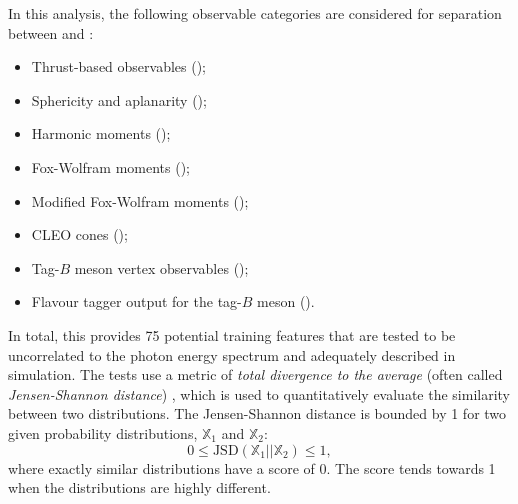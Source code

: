 In this analysis, the following observable categories are considered for separation between \epem\ra\qqbar and \BtoXsgamma:
\begin{itemize}
    \item Thrust-based observables ();
    \item Sphericity and aplanarity ();
    \item Harmonic moments ();
    \item Fox-Wolfram moments ();
    \item Modified Fox-Wolfram moments ();
    \item CLEO cones ();
    \item Tag-$B$ meson vertex observables ();
    \item Flavour tagger output for the tag-$B$ meson ().
\end{itemize}

In total, this provides 75 potential training features that are tested to be uncorrelated to the photon energy spectrum and adequately described in simulation.
The tests use a metric of \textit{total divergence to the average} (often called \textit{Jensen-Shannon distance}) \cite{Lin:1991abc},
which is used to quantitatively evaluate the similarity between two distributions.
The Jensen-Shannon distance is bounded by 1 for two given probability distributions, $\mathbb{X}_1$ and $\mathbb{X}_2$:
\begin{equation}\label{eq:js_distance}
    0\leq\mathrm{JSD}(\mathbb{X}_1||\mathbb{X}_2) \leq1,
\end{equation}
where exactly similar distributions have a score of 0. 
The score tends towards 1 when the distributions are highly different.

